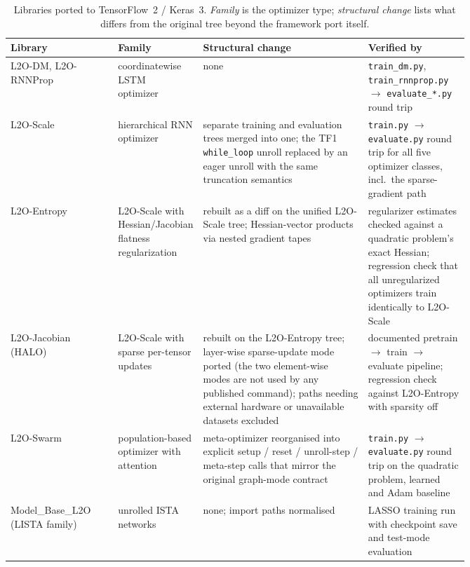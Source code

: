 \begin{table}[htbp]
\centering
\small
\caption{Libraries ported to TensorFlow~2 / Keras~3. \emph{Family} is the optimizer type; \emph{structural change} lists what differs from the original tree beyond the framework port itself.}
\label{tab:migrated-libraries}
\begin{tabular}{@{} l p{0.18\linewidth} p{0.36\linewidth} p{0.22\linewidth} @{}}
\toprule
Library & Family & Structural change & Verified by \\
\midrule
L2O-DM, L2O-RNNProp & coordinatewise LSTM optimizer~\cite{andrychowicz2016,lv2017} & none & \texttt{train\_dm.py}, \texttt{train\_rnnprop.py} $\to$ \texttt{evaluate\_*.py} round trip \\
L2O-Scale & hierarchical RNN optimizer~\cite{wichrowska2017} & separate training and evaluation trees merged into one; the TF1 \texttt{while\_loop} unroll replaced by an eager unroll with the same truncation semantics & \texttt{train.py} $\to$ \texttt{evaluate.py} round trip for all five optimizer classes, incl.\ the sparse-gradient path \\
L2O-Entropy & L2O-Scale with Hessian/Jacobian flatness regularization~\cite{yang2023} & rebuilt as a diff on the unified L2O-Scale tree; Hessian-vector products via nested gradient tapes & regularizer estimates checked against a quadratic problem's exact Hessian; regression check that all unregularized optimizers train identically to L2O-Scale \\
L2O-Jacobian (HALO) & L2O-Scale with sparse per-tensor updates~\cite{halo2020} & rebuilt on the L2O-Entropy tree; layer-wise sparse-update mode ported (the two element-wise modes are not used by any published command); paths needing external hardware or unavailable datasets excluded & documented pretrain $\to$ train $\to$ evaluate pipeline; regression check against L2O-Entropy with sparsity off \\
L2O-Swarm & population-based optimizer with attention~\cite{cao2019swarm} & meta-optimizer reorganised into explicit setup / reset / unroll-step / meta-step calls that mirror the original graph-mode contract & \texttt{train.py} $\to$ \texttt{evaluate.py} round trip on the quadratic problem, learned and Adam baseline \\
Model\_Base\_L2O (LISTA family) & unrolled ISTA networks~\cite{gregor2010,liu2019alista} & none; import paths normalised & LASSO training run with checkpoint save and test-mode evaluation \\
\bottomrule
\end{tabular}
\end{table}
